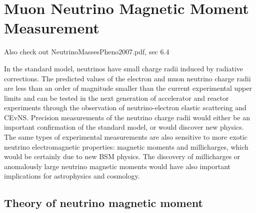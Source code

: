 \chapter{Muon Neutrino Magnetic Moment Measurement}\label{sec:NeutrinoMagMoment}

Also check out NeutrinoMassesPheno2007.pdf, sec 6.4


In the standard model, neutrinos have small charge radii induced by radiative corrections. The predicted values of the electron and muon neutrino charge radii are less than an order of magnitude smaller than the current experimental upper limits and can be tested in the next generation of accelerator and reactor experiments through the observation of neutrino-electron elastic scattering and CEvNS. Precision measurements of the neutrino charge radii would either be an important confirmation of the standard model, or would discover new physics. The same types of experimental measurements are also sensitive to more exotic neutrino electromagnetic properties: magnetic moments and millicharges, which would be certainly due to new BSM physics. The discovery of millicharges or anomalously large neutrino magnetic moments would have also important implications for astrophysics and cosmology.\cite{SnowmassNeutrinoFrontierReport.pdf}

\section{Theory of neutrino magnetic moment}




